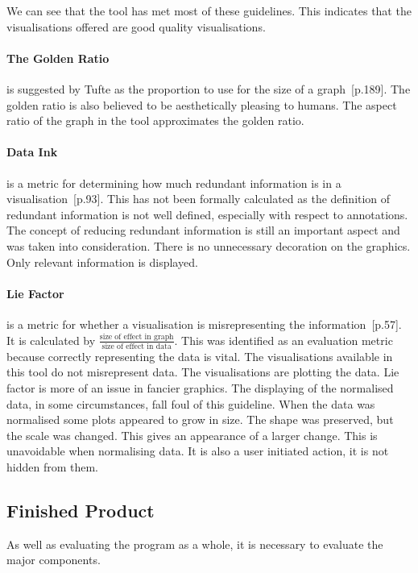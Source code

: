 We can see that the tool has met most of these guidelines.  This indicates that the visualisations offered are good quality visualisations.

\paragraph*{The Golden Ratio} is suggested by Tufte as the proportion to use for the size of a graph~\cite{tufte}[p.189].  The golden ratio is also believed to be aesthetically pleasing to humans.  The aspect ratio of the graph in the tool approximates the golden ratio.

\paragraph*{Data Ink} is a metric for determining how much redundant information is in a visualisation~\cite{tufte}[p.93].  This has not been formally calculated as the definition of redundant information is not well defined, especially with respect to annotations.  The concept of reducing redundant information is still an important aspect and was taken into consideration.  There is no unnecessary decoration on the graphics.  Only relevant information is displayed.

\paragraph*{Lie Factor} is a metric for whether a visualisation is misrepresenting the information~\cite{tufte}[p.57].  It is calculated by $\frac{\text{size of effect in graph}}{\text{size of effect in data}}$.  This was identified as an evaluation metric because correctly representing the data is vital.  The visualisations available in this tool do not misrepresent data.  The visualisations are plotting the data.  Lie factor is more of an issue in fancier graphics.  The displaying of the normalised data, in some circumstances, fall foul of this guideline.  When the data was normalised some plots appeared to grow in size.  The shape was preserved, but the scale was changed.  This gives an appearance of a larger change.  This is unavoidable when normalising data.  It is also a user initiated action, it is not hidden from them.

\subsection{Finished Product}

As well as evaluating the program as a whole, it is necessary to evaluate the major components.

